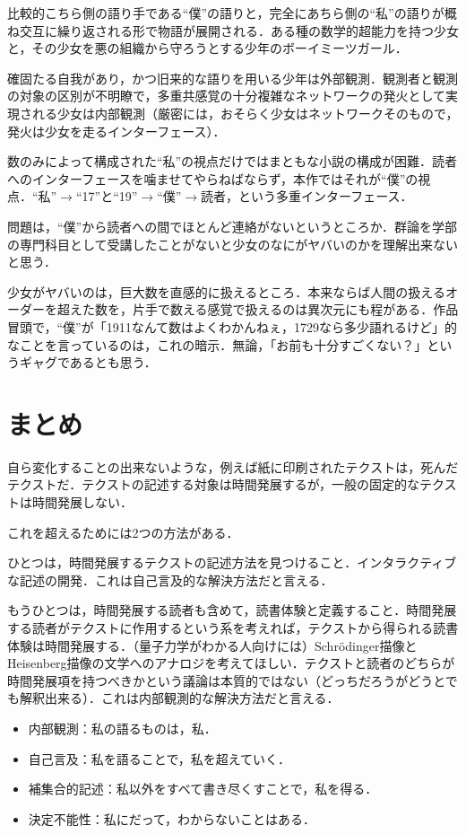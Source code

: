 \documentclass[10pt, a5paper, twoside]{jsarticle}
\begin{document}
			比較的こちら側の語り手である“僕”の語りと，完全にあちら側の“私”の語りが概ね交互に繰り返される形で物語が展開される．ある種の数学的超能力を持つ少女と，その少女を悪の組織から守ろうとする少年のボーイミーツガール．

			確固たる自我があり，かつ旧来的な語りを用いる少年は外部観測．観測者と観測の対象の区別が不明瞭で，多重共感覚の十分複雑なネットワークの発火として実現される少女は内部観測（厳密には，おそらく少女はネットワークそのもので，発火は少女を走るインターフェース）．

			数のみによって構成された“私”の視点だけではまともな小説の構成が困難．読者へのインターフェースを噛ませてやらねばならず，本作ではそれが“僕”の視点．“私”$ \rightarrow $“17”と“19”$ \rightarrow $“僕”$ \rightarrow $読者，という多重インターフェース．

			問題は，“僕”から読者への間でほとんど連絡がないというところか．群論を学部の専門科目として受講したことがないと少女のなにがヤバいのかを理解出来ないと思う．

			少女がヤバいのは，巨大数を直感的に扱えるところ．本来ならば人間の扱えるオーダーを超えた数を，片手で数える感覚で扱えるのは異次元にも程がある．作品冒頭で，“僕”が「1911なんて数はよくわかんねぇ，1729なら多少語れるけど」的なことを言っているのは，これの暗示．無論，「お前も十分すごくない？」というギャグであるとも思う．

	\section{まとめ}

		自ら変化することの出来ないような，例えば紙に印刷されたテクストは，死んだテクストだ．テクストの記述する対象は時間発展するが，一般の固定的なテクストは時間発展しない．

		これを超えるためには2つの方法がある．

		ひとつは，時間発展するテクストの記述方法を見つけること．インタラクティブな記述の開発．これは自己言及的な解決方法だと言える．

		もうひとつは，時間発展する読者も含めて，読書体験と定義すること．時間発展する読者がテクストに作用するという系を考えれば，テクストから得られる読書体験は時間発展する．（量子力学がわかる人向けには）Schrödinger描像とHeisenberg描像の文学へのアナロジを考えてほしい．テクストと読者のどちらが時間発展項を持つべきかという議論は本質的ではない（どっちだろうがどうとでも解釈出来る）．これは内部観測的な解決方法だと言える．

		\begin{itemize}
		
			\item 内部観測：私の語るものは，私．
		
			\item 自己言及：私を語ることで，私を超えていく．
		
			\item 補集合的記述：私以外をすべて書き尽くすことで，私を得る．
		
			\item 決定不能性：私にだって，わからないことはある．

		\end{itemize}
\end{document}
